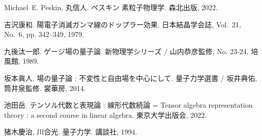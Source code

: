 \documentclass[dvipdfmx, a4paper]{jsarticle}
\theoremstyle{break}
\numberwithin{equation}{section}
\begin{document}
\begin{thebibliography}{慶光94}
Michael~E. Peskin, 丸信人.
\newblock ペスキン 素粒子物理学.
\newblock 森北出版, 2022.





吉沢康和.
\newblock 陽電子消滅ガンマ線のドップラー効果.
\newblock 日本結晶学会誌, Vol.~21, No.~6, pp. 342--349, 1979.

九後汰一郎.
\newblock ゲージ場の量子論.
\newblock 新物理学シリーズ / 山内恭彦監修, No. 23-24. 培風館, 1989.

坂本眞人.
\newblock 場の量子論 : 不変性と自由場を中心にして.
\newblock 量子力学選書 / 坂井典佑, 筒井泉監修. 裳華房, 2014.

池田岳.
\newblock テンソル代数と表現論 : 線形代数続論 = Tensor algebra representation
  theory : a second course in linear algebra.
\newblock 東京大学出版会, 2022.

猪木慶治, 川合光.
\newblock 量子力学.
\newblock 講談社, 1994.
\end{thebibliography}
%
%
%
\end{document}
